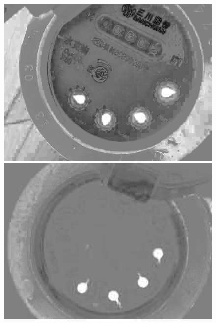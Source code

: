 \documentclass[a4paper]{ctexart}
\begin{document}
\begin{figure}[htbp]
\begin{minipage}[t]{0.25\textwidth}
		\includegraphics[width=\textwidth]{figure/R_channel/img3.jpg}
	\end{minipage}
	\begin{minipage}[t]{0.25\textwidth}
		\centering
		\includegraphics[width=\textwidth]{figure/R_channel/img4.jpg}
	\end{minipage}
	\begin{minipage}[t]{0.25\textwidth}
		\centering

\end{minipage}
\end{figure}
\end{document}
